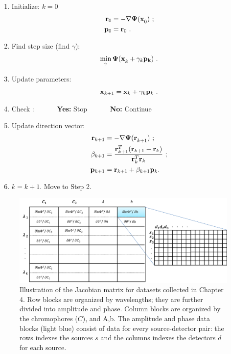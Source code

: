\begin{enumerate}[noitemsep]
\item Initialize: $k=0$
\vspace{-17mm}
\begin{align}
\mathbf{r}_0 &=-\nabla\mathbf{\Psi(x}_0) \ ; \\
\mathbf{p}_0 &= \mathbf{r}_0 \ .
\end{align}
\item Find step size (find $\gamma$):
\vspace{-10mm}
\begin{equation}
\min_{\gamma}\mbf{\Psi(x}_k+\gamma_k\mbf{p_k}) \ .
\end{equation}
\item Update parameters:
\vspace{-10mm}
\begin{equation}
\mathbf{x}_{k+1} = \mathbf{x}_{k} + \gamma_k \mathbf{p}_{k} \ .
\end{equation}
\item Check : ~~~~~~\textbf{Yes:} Stop ~~~~~~\textbf{No:} Continue
\vspace{4mm}
\item Update direction vector:
\vspace{-17mm}
\begin{align}
\mathbf{r}_{k+1} &=-\nabla\mathbf{\Psi(r}_{k+1}) \ ; \\
\beta_{k+1} &= \frac{\mathbf{r}^T_{k+1}(\mathbf{r}_{k+1}-\mathbf{r}_{k})}{\mathbf{r}^T_{k}\mathbf{r}_{k}} \ ; \\
\mathbf{p}_{k+1} &= \mathbf{r}_{k+1} + \beta_{k+1}\mathbf{p}_{k} .
\end{align}
\item \vspace{-5mm} $k=k+1$. Move to Step 2.
\end{enumerate}
\begin{figure}[h]
\centering
\label{fig:jacobill}
\includegraphics[width=14.5cm]{./figures/2_Theory/jacobschem.png}
\caption[Illustration of the Jacobian matrix for Gen3 imager datasets]{Illustration of the Jacobian matrix for datasets collected in Chapter 4. Row blocks are organized by wavelengths; they are further divided into amplitude and phase. Column blocks are organized by the chromophores ($C$), and A,b. The amplitude and phase data blocks (light blue) consist of data for every source-detector pair: the rows indexes the sources $s$ and the columns indexes the detectors $d$ for each source. }
\end{figure}
%
